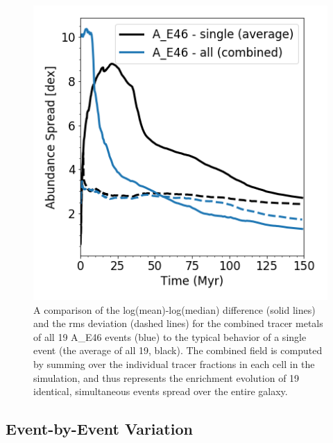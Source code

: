 \documentclass[twocolumn]{aastex62}
\newcommand{\runone}{A\_}
\begin{document}
\begin{figure}
  \centering
  \includegraphics[width=0.975\linewidth]{combined_mean-median}
  \caption{A comparison of the log(mean)-log(median) difference (solid lines) and the rms deviation (dashed lines) for the combined tracer metals of all 19 \runone E46 events (blue) to the typical behavior of a single event (the average of all 19, black). The combined field is computed by summing over the individual tracer fractions in each cell in the simulation, and thus represents the enrichment evolution of 19 identical, simultaneous events spread over the entire galaxy.}
  \label{fig:combined spread}
\end{figure}

\subsection{Event-by-Event Variation}
\label{sec:individual event variation}
\end{document}
